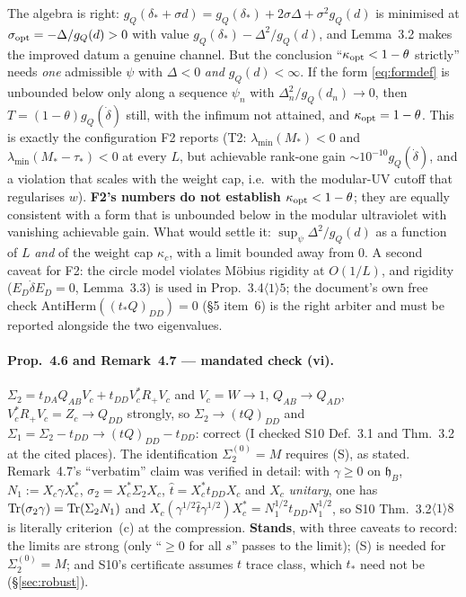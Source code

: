 \documentclass[11pt]{article}
\newcommand{\hh}{\mathfrak h}
\begin{document}
\begin{verdictgap}
The algebra is right: $g_Q(\delta_*+\sigma d)=g_Q(\delta_*)+2\sigma\Delta+\sigma^2g_Q(d)$ is
minimised at $\sigma_{\rm opt}=-\Delta/g_Q(d)>0$ with value $g_Q(\delta_*)-\Delta^2/g_Q(d)$,
and Lemma~3.2 makes the improved datum a genuine channel.  But the conclusion
``$\kappa_{\rm opt}<1-\theta$ strictly'' needs \emph{one} admissible $\psi$ with
$\Delta<0$ \emph{and} $g_Q(d)<\infty$.  If the form \eqref{eq:formdef} is unbounded below
only along a sequence $\psi_n$ with $\Delta_n^2/g_Q(d_n)\to0$, then
$T=(1-\theta)g_Q(\dot\delta)$ still, with the infimum not attained, and
$\kappa_{\rm opt}=1-\theta$.  This is exactly the configuration F2 reports (T2:
$\lambda_{\min}(M_*)<0$ and $\lambda_{\min}(M_*-\tau_*)<0$ at every $L$, but achievable
rank-one gain $\sim10^{-10}g_Q(\dot\delta)$, and a violation that scales with the weight
cap, i.e.\ with the modular-UV cutoff that regularises $w$).  \textbf{F2's numbers do not
establish $\kappa_{\rm opt}<1-\theta$}; they are equally consistent with a form that is
unbounded below in the modular ultraviolet with vanishing achievable gain.  What would
settle it: $\sup_\psi\Delta^2/g_Q(d)$ as a function of $L$ \emph{and} of the weight cap
$\kappa_c$, with a limit bounded away from $0$.  A second caveat for F2: the circle model
violates M\"obius rigidity at $O(1/L)$, and rigidity ($E_D\dot\delta E_D=0$, Lemma~3.3) is
used in Prop.~3.4$\langle1\rangle5$; the document's own free check
$\mathrm{AntiHerm}((t_*Q)_{DD})=0$ (\S5 item~6) is the right arbiter and must be reported
alongside the two eigenvalues.
\end{verdictgap}

\paragraph{Prop.~4.6 and Remark~4.7 --- mandated check (vi).}
$\Sigma_2=t_{DA}Q_{AB}V_c+t_{DD}V_c^*R_+V_c$ and $V_c=W\to1$, $Q_{AB}\to Q_{AD}$,
$V_c^*R_+V_c=Z_c\to Q_{DD}$ strongly, so $\Sigma_2\to(tQ)_{DD}$ and
$\Sigma_1=\Sigma_2-t_{DD}\to(tQ)_{DD}-t_{DD}$: correct (I checked S10 Def.~3.1 and
Thm.~3.2 at the cited places).  The identification $\Sigma_2^{(0)}=M$ requires (S), as
stated.  Remark~4.7's ``verbatim'' claim was verified in detail: with $\gamma\ge0$ on
$\hh_B$, $N_1:=X_c\gamma X_c^*$, $\sigma_2=X_c^*\Sigma_2X_c$, $\hat t=X_c^*t_{DD}X_c$ and
$X_c$ \emph{unitary}, one has $\operatorname{Tr}(\sigma_2\gamma)=\operatorname{Tr}(\Sigma_2N_1)$ and
$X_c(\gamma^{1/2}\hat t\gamma^{1/2})X_c^*=N_1^{1/2}t_{DD}N_1^{1/2}$, so S10
Thm.~3.2$\langle1\rangle8$ is literally criterion~(c) at the compression.  \textbf{Stands},
with three caveats to record: the limits are strong (only ``$\ge0$ for all $s$'' passes to
the limit); (S) is needed for $\Sigma_2^{(0)}=M$; and S10's certificate assumes $t$ trace
class, which $t_*$ need not be (\S\ref{sec:robust}).
\end{document}

